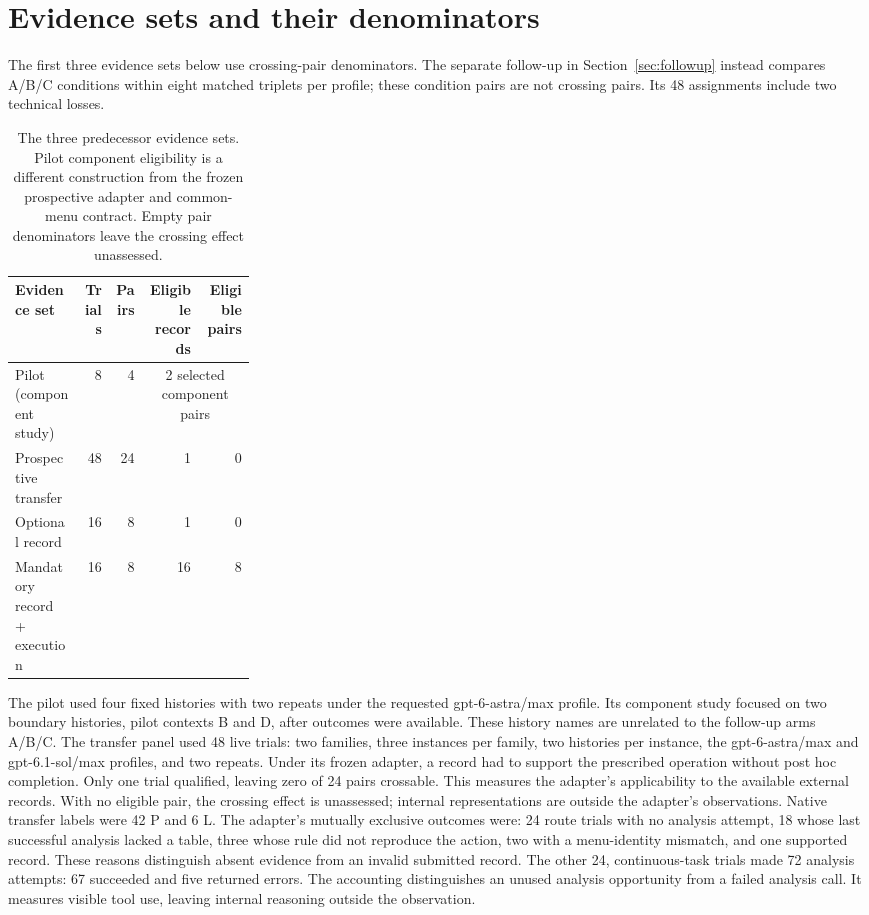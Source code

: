\section{Evidence sets and their denominators}
The first three evidence sets below use crossing-pair denominators.
The separate follow-up in Section~\ref{sec:followup} instead compares A/B/C
conditions within eight matched triplets per profile; these condition pairs
are not crossing pairs. Its 48 assignments include two technical losses.
\begin{table}[htbp]
\centering\small
\begin{tabular}{p{0.28\linewidth}rrrr}
\toprule
Evidence set & Trials & Pairs & Eligible records & Eligible pairs\\
\midrule
Pilot (component study) & 8 & 4 & \multicolumn{2}{c}{2 selected component pairs}\\
Prospective transfer & 48 & 24 & 1 & 0\\
Optional record & 16 & 8 & 1 & 0\\
Mandatory record + execution & 16 & 8 & 16 & 8\\
\bottomrule
\end{tabular}
\caption{The three predecessor evidence sets. Pilot component eligibility is a different
construction from the frozen prospective adapter and common-menu contract.
Empty pair denominators leave the crossing effect unassessed.}
\end{table}

The pilot used four fixed histories with two repeats under the requested
gpt-6-astra/max profile. Its component study
focused on two boundary histories, pilot contexts B and D, after outcomes
were available. These history names are unrelated to the follow-up arms A/B/C.
The transfer panel used 48 live trials: two families, three instances per
family, two histories per instance, the gpt-6-astra/max and
gpt-6.1-sol/max profiles, and two repeats. Under its frozen adapter, a record had to
support the prescribed operation without post hoc completion. Only one trial
qualified, leaving zero of 24 pairs crossable. This measures the adapter's applicability to the available external
records. With no eligible pair, the crossing effect is unassessed; internal
representations are outside the adapter's observations. Native transfer labels were 42 P and 6 L. The adapter's mutually exclusive
outcomes were: 24 route trials with no analysis attempt, 18 whose last successful
analysis lacked a table, three whose rule did not reproduce the action, two
with a menu-identity mismatch, and one supported record. These reasons
distinguish absent evidence from an invalid submitted record.
The other 24, continuous-task trials made 72 analysis attempts: 67 succeeded
and five returned errors. The accounting distinguishes an unused analysis opportunity from a failed
analysis call. It measures visible tool use, leaving internal reasoning
outside the observation.

